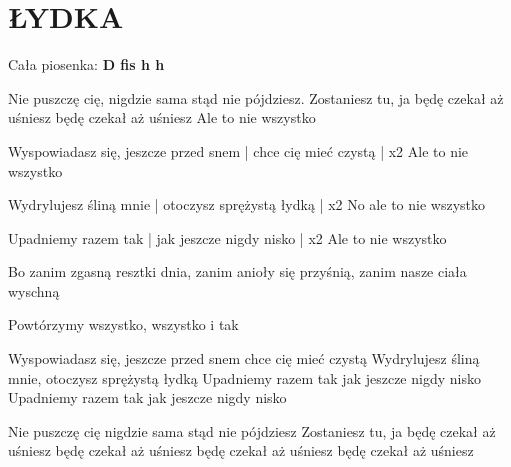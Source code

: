 \documentclass[../../../songbook.tex]{subfiles}
\begin{document}
\TabPositions{8cm} %
\section*{ŁYDKA}
{}
\vspace{0.5cm}
Cała piosenka: {\color{red}\textbf{D fis h h} } \newline	

Nie puszczę cię, nigdzie sama stąd nie pójdziesz.  \newline
Zostaniesz tu, ja będę czekał aż uśniesz  \newline
będę czekał aż uśniesz \newline
\-\hspace{1cm} Ale to nie wszystko  \newline

Wyspowiadasz się, jeszcze przed snem 	\tab   |    \newline
chce cię mieć czystą 					\tab   | x2 \newline
\-\hspace{1cm} Ale to nie wszystko \newline

Wydrylujesz śliną mnie 		\tab   |      \newline
otoczysz sprężystą łydką 	\tab   | x2    \newline
\-\hspace{1cm} No ale to nie wszystko   \newline

Upadniemy razem tak 		\tab   |      \newline
jak jeszcze nigdy nisko 	\tab   |  x2  \newline
\-\hspace{1cm} Ale to nie wszystko  \newline

Bo zanim zgasną resztki dnia,  \newline
zanim anioły się przyśnią,  \newline
zanim nasze ciała wyschną  \newline

Powtórzymy wszystko, \newline
wszystko \newline
i tak \newline

Wyspowiadasz się, jeszcze przed snem  \newline
chce cię mieć czystą \newline
Wydrylujesz śliną mnie, otoczysz sprężystą łydką \newline
Upadniemy razem tak jak jeszcze nigdy nisko \newline
Upadniemy razem tak jak jeszcze nigdy nisko \newline

Nie puszczę cię \newline
nigdzie sama stąd nie pójdziesz  \newline
Zostaniesz tu, ja będę czekał aż uśniesz  \newline
będę czekał aż uśniesz \newline
będę czekał aż uśniesz \newline
będę czekał aż uśniesz \newline
\end{document}

